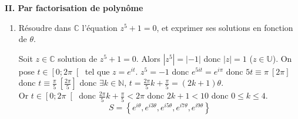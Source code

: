 \documentclass[a4paper,french,bookmarks]{article}
\begin{document}
\noindent\textbf{II. Par factorisation de polynôme}

\begin{enumerate}
    \item Résoudre dans $\mathbb{C}$ l'équation $z^5+1=0$, et exprimer ses solutions en fonction de $\theta$.
    \begin{tcolorbox}[colback=black!8,colframe=black!9,boxrule=.25pt,enhanced,arc is angular,arc=0pt]
    Soit $z \in \mathbb{C}$ solution de $z^5+1=0$. Alors $|z^5|=|-1|$ donc $|z|=1$ ($z \in \mathbb{U}$). On pose $t \in \left[0;2\pi\right[$ tel que $z = e^{it}$.
    $z^5 = -1$ donc $e^{5it} = e^{i\pi}$ donc $5t \equiv \pi \ \left[2\pi\right]$ donc $t \equiv \frac{\pi}{5} \ \left[\frac{2\pi}{5}\right]$ donc $\exists k \in \mathbb{N}$, $t = \frac{2\pi}{5}k + \frac{\pi}{5} = (2k+1)\theta$.\\
    Or $t \in \left[0;2\pi\right[$ donc $\frac{2\pi}{5}k + \frac{\pi}{5} < 2\pi$ donc $2 k + 1 < 10$ donc $0 \leq k \leq 4$.
    \[ S = \left\lbrace e^{i\theta}, e^{i3\theta}, e^{i5\theta}, e^{i7\theta}, e^{i9\theta}\right\rbrace \]
    \end{tcolorbox}
    

\end{enumerate}
\end{document}
